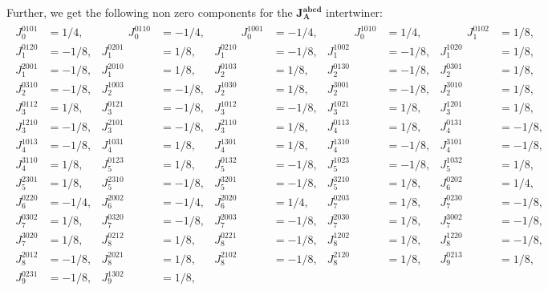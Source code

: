 \documentclass[a4paper,12pt, DIV=14, BCOR=5mm, twoside, headsepline, numbers=noenddot]{scrbook}
\begin{document}
Further, we get the following non zero components for the $\boldsymbol{J_A^{abcd}}$ intertwiner:
\begin{align}\label{AreaJ}
    \begin{alignedat}{5}
    J_{0}^{0101} &= 1/4, & \hspace{1cm}
J_{0}^{0110} &= -1/4, & \hspace{1cm}
J_{0}^{1001} &= -1/4, & \hspace{1cm}
J_{0}^{1010} &= 1/4, & \hspace{1cm}
J_{1}^{0102} &= 1/8, \\ 
J_{1}^{0120} &= -1/8, & 
J_{1}^{0201} &= 1/8, & 
J_{1}^{0210} &= -1/8, & 
J_{1}^{1002} &= -1/8, & 
J_{1}^{1020} &= 1/8, \\ 
J_{1}^{2001} &= -1/8, & 
J_{1}^{2010} &= 1/8, & 
J_{2}^{0103} &= 1/8, & 
J_{2}^{0130} &= -1/8, & 
J_{2}^{0301} &= 1/8, \\ 
J_{2}^{0310} &= -1/8, & 
J_{2}^{1003} &= -1/8, & 
J_{2}^{1030} &= 1/8, & 
J_{2}^{3001} &= -1/8, & 
J_{2}^{3010} &= 1/8, \\ 
J_{3}^{0112} &= 1/8, & 
J_{3}^{0121} &= -1/8, & 
J_{3}^{1012} &= -1/8, & 
J_{3}^{1021} &= 1/8, & 
J_{3}^{1201} &= 1/8, \\ 
J_{3}^{1210} &= -1/8, & 
J_{3}^{2101} &= -1/8, & 
J_{3}^{2110} &= 1/8, & 
J_{4}^{0113} &= 1/8, & 
J_{4}^{0131} &= -1/8, \\ 
J_{4}^{1013} &= -1/8, & 
J_{4}^{1031} &= 1/8, & 
J_{4}^{1301} &= 1/8, & 
J_{4}^{1310} &= -1/8, & 
J_{4}^{3101} &= -1/8,  \\
J_{4}^{3110} &= 1/8, & 
J_{5}^{0123} &= 1/8, & 
J_{5}^{0132} &= -1/8, & 
J_{5}^{1023} &= -1/8, & 
J_{5}^{1032} &= 1/8, \\ 
J_{5}^{2301} &= 1/8, & 
J_{5}^{2310} &= -1/8, & 
J_{5}^{3201} &= -1/8, & 
J_{5}^{3210} &= 1/8, & 
J_{6}^{0202} &= 1/4, \\ 
J_{6}^{0220} &= -1/4, & 
J_{6}^{2002} &= -1/4, & 
J_{6}^{2020} &= 1/4, & 
J_{7}^{0203} &= 1/8, & 
J_{7}^{0230} &= -1/8, \\ 
J_{7}^{0302} &= 1/8, & 
J_{7}^{0320} &= -1/8, & 
J_{7}^{2003} &= -1/8, & 
J_{7}^{2030} &= 1/8, & 
J_{7}^{3002} &= -1/8, \\ 
J_{7}^{3020} &= 1/8, & 
J_{8}^{0212} &= 1/8, & 
J_{8}^{0221} &= -1/8, & 
J_{8}^{1202} &= 1/8, & 
J_{8}^{1220} &= -1/8, \\ 
J_{8}^{2012} &= -1/8, & 
J_{8}^{2021} &= 1/8, & 
J_{8}^{2102} &= -1/8, & 
J_{8}^{2120} &= 1/8, & 
J_{9}^{0213} &= 1/8, \\ 
J_{9}^{0231} &= -1/8, & 
J_{9}^{1302} &= 1/8, & 

\end{alignedat}
\end{align}
\end{document}
